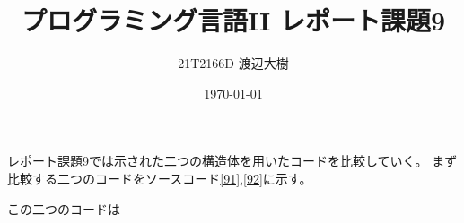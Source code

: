 \documentclass[a4paper,11pt]{jsarticle}
\begin{document}
\title{プログラミング言語I\hspace{-1.2pt}I レポート課題9}
\author{21T2166D 渡辺大樹}
\date{\today}
\maketitle

レポート課題9では示された二つの構造体を用いたコードを比較していく。
まず比較する二つのコードをソースコード\ref{91},\ref{92}に示す。



この二つのコードは
\end{document}
